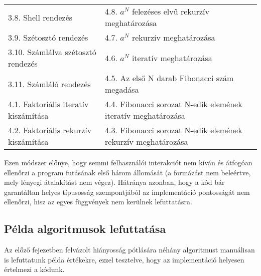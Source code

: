 \begin{tabularx}{\textwidth}{X X}
3.8. Shell rendezés & 4.8. $a^N$ felezéses elvű rekurzív meghatározása \\
3.9. Szétosztó rendezés & 4.7. $a^N$ rekurzív meghatározása \\
3.10. Számlálva szétosztó rendezés & 4.6. $a^N$ iteratív meghatározása \\
3.11. Számláló rendezés & 4.5. Az első N darab Fibonacci szám megadása \\
4.1. Faktoriális iteratív kiszámítása & 4.4. Fibonacci sorozat N-edik elemének iteratív meghatározása \\
4.2. Faktoriális rekurzív kiszámítása & 4.3. Fibonacci sorozat N-edik elemének rekurzív meghatározása \\
















































\end{tabularx}

Ezen módszer előnye, hogy semmi felhasználói interakciót nem kíván és átfogóan ellenőrzi a program futásának első három állomását (a formázást nem beleértve, mely lényegi átalakítást nem végez). Hátránya azonban, hogy a kód bár garantáltan helyes típusosság szempontjából az implementáció pontosságát nem ellenőrzi, hisz az egyes függvények nem kerülnek lefuttatásra.

\subsection{Példa algoritmusok lefuttatása}

Az előző fejezetben felvázolt hiányosság pótlására néhány algoritmust manuálisan is lefuttatunk példa értékekre, ezzel tesztelve, hogy az implementáció helyesen értelmezi a kódunk.

